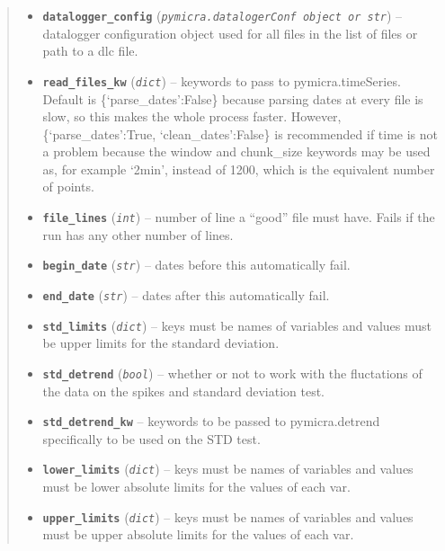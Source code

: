 \documentclass[a4paper,10pt,oneside]{sphinxmanual}
\begin{document}
\begin{fulllineitems}
\begin{quote}
\begin{description}
\begin{itemize}
\item {} 
\textbf{\texttt{datalogger\_config}} (\emph{\texttt{pymicra.datalogerConf object or str}}) -- datalogger configuration object used for all files in the list of files or path to a dlc file.

\item {} 
\textbf{\texttt{read\_files\_kw}} (\emph{\texttt{dict}}) -- keywords to pass to pymicra.timeSeries. Default is \{`parse\_dates':False\} because parsing dates
at every file is slow, so this makes the whole process faster.
However, \{`parse\_dates':True, `clean\_dates':False\} is recommended if time is not a problem because
the window and chunk\_size keywords may be used as, for example `2min', instead of 1200, which is the
equivalent number of points.

\item {} 
\textbf{\texttt{file\_lines}} (\emph{\texttt{int}}) -- number of line a ``good'' file must have. Fails if the run has any other number of lines.

\item {} 
\textbf{\texttt{begin\_date}} (\emph{\texttt{str}}) -- dates before this automatically fail.

\item {} 
\textbf{\texttt{end\_date}} (\emph{\texttt{str}}) -- dates after this automatically fail.

\item {} 
\textbf{\texttt{std\_limits}} (\emph{\texttt{dict}}) -- keys must be names of variables and values must be upper limits for the standard deviation.

\item {} 
\textbf{\texttt{std\_detrend}} (\emph{\texttt{bool}}) -- whether or not to work with the fluctations of the data on the spikes and standard deviation test.

\item {} 
\textbf{\texttt{std\_detrend\_kw}} -- keywords to be passed to pymicra.detrend specifically to be used on the STD test.

\item {} 
\textbf{\texttt{lower\_limits}} (\emph{\texttt{dict}}) -- keys must be names of variables and values must be lower absolute limits for the values of each var.

\item {} 
\textbf{\texttt{upper\_limits}} (\emph{\texttt{dict}}) -- keys must be names of variables and values must be upper absolute limits for the values of each var.


\end{itemize}
\end{description}
\end{quote}
\end{fulllineitems}
\end{document}
